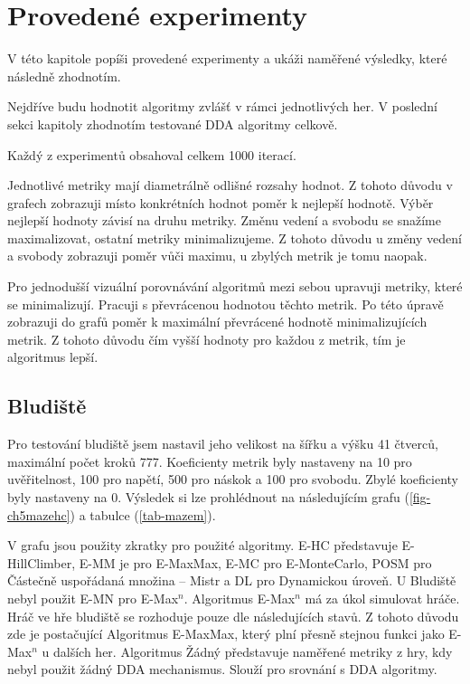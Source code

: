 \chapter{Provedené experimenty}

V této kapitole popíši provedené experimenty a ukáži naměřené výsledky, které následně zhodnotím.

Nejdříve budu hodnotit algoritmy zvlášť v rámci jednotlivých her. V poslední sekci kapitoly zhodnotím testované DDA algoritmy celkově.

Každý z experimentů obsahoval celkem 1000 iterací.

Jednotlivé metriky mají diametrálně odlišné rozsahy hodnot. Z tohoto důvodu v grafech zobrazuji místo konkrétních hodnot poměr k nejlepší hodnotě. Výběr nejlepší hodnoty závisí na druhu metriky. Změnu vedení a svobodu se snažíme maximalizovat, ostatní metriky minimalizujeme. Z tohoto důvodu u změny vedení a svobody zobrazuji poměr vůči maximu, u zbylých metrik je tomu naopak.

Pro jednodušší vizuální porovnávání algoritmů mezi sebou upravuji metriky, které se minimalizují. Pracuji s převrácenou hodnotou těchto metrik. Po této úpravě zobrazuji do grafů poměr k maximální převrácené hodnotě minimalizujících metrik. Z tohoto důvodu čím vyšší hodnoty pro každou z metrik, tím je algoritmus lepší.

\section{Bludiště}

Pro testování bludiště jsem nastavil jeho velikost na šířku a výšku 41 čtverců, maximální počet kroků 777. Koeficienty metrik byly nastaveny na 10 pro uvěřitelnost, 100 pro napětí, 500 pro náskok a 100 pro svobodu. Zbylé koeficienty byly nastaveny na 0. Výsledek si lze prohlédnout na následujícím grafu (\ref{fig-ch5mazehc}) a tabulce (\ref{tab-mazem}).

V grafu jsou použity zkratky pro použité algoritmy. E-HC představuje E-HillClimber, E-MM je pro E-MaxMax, E-MC pro E-MonteCarlo, POSM pro Částečně uspořádaná množina – Mistr a DL pro Dynamickou úroveň. U Bludiště nebyl použit E-MN pro E-Max$^n$. Algoritmus E-Max$^n$ má za úkol simulovat hráče. Hráč ve hře bludiště se rozhoduje pouze dle následujících stavů. Z tohoto důvodu zde je postačující Algoritmus E-MaxMax, který plní přesně stejnou funkci jako E-Max$^n$ u dalších her. Algoritmus Žádný představuje naměřené metriky z hry, kdy nebyl použit žádný DDA mechanismus. Slouží pro srovnání s DDA algoritmy.

